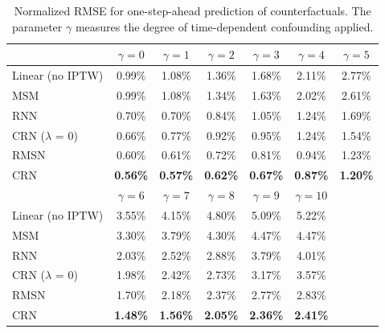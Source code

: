 \documentclass{article} %
\begin{document}
		\begin{table}[ht]
		\caption{Normalized RMSE for one-step-ahead prediction of counterfactuals. The parameter $\gamma$ measures the degree of time-dependent confounding applied.  }
		\label{tab:results_one_step_ahead_prediction}
		\vskip 0.15in
		\begin{center}
			\begin{small}
				\begin{tabular}{lcccccc}
					\toprule
					 & $\gamma=0$ & $\gamma=1$ & $\gamma=2$  & $\gamma=3$ & $\gamma=4$ & $\gamma=5$ \\
					\hline
					\hline
					Linear (no IPTW) &  0.99\% & 1.08\% & 1.36\% & 1.68\% & 2.11\% & 2.77\% \\
					MSM &  0.99\%  & 1.08\% & 1.34\% & 1.63\% & 2.02\%& 2.61\%  \\
					\hline
					RNN &  0.70\%  & 0.70\% & 0.84\% & 1.05\% & 1.24\% & 1.69\% \\
					CRN ($\lambda$ = 0)  &  0.66\%  & 0.77\% & 0.92\% & 0.95\% & 1.24\% & 1.54\% \\
					\hline
					RMSN &  0.60\%  & 0.61\% & 0.72\% & 0.81\% & 0.94\% & 1.23\% \\
					CRN &   \textbf{0.56\%}  & \textbf{0.57\%} & \textbf{0.62\%} &\textbf{ 0.67\%} & \textbf{0.87\%} & \textbf{1.20\%} \\
					\midrule 
					\midrule 
					\midrule
					 & $\gamma=6$ & $\gamma=7$ & $\gamma=8$  & $\gamma=9$ & $\gamma=10$ & \\
					\hline
					\hline
					Linear (no IPTW) &  3.55\%  & 4.15\% & 4.80\% & 5.09\% & 5.22\% &\\
					MSM &   3.30\%  & 3.79\% & 4.30\% & 4.47\% & 4.47\% &\\
					\hline
					RNN &  2.03\%  & 2.52\% & 2.88\% & 3.79\% & 4.01\% &\\
					CRN ($\lambda$ = 0)  &  1.98\%  & 2.42\% & 2.73\% & 3.17\% & 3.57\% &\\
					\hline
					RMSN &  1.70\%  & 2.18\% & 2.37\% & 2.77\% & 2.83\% &\\
					CRN &   \textbf{1.48\%}  & \textbf{1.56\%} & \textbf{2.05\%} & \textbf{2.36\%} & \textbf{2.41\%} &\\
					\bottomrule
				\end{tabular}
			\end{small}
		\end{center}
		\vskip -0.1in
	\end{table}
\end{document}
